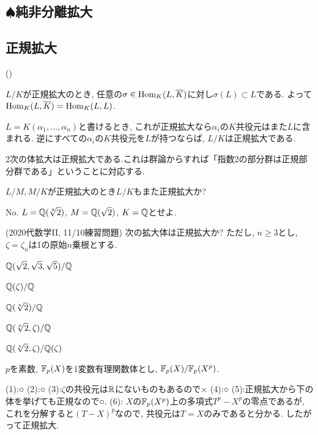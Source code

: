 \subsection{$\spadesuit$純非分離拡大}

\subsection{正規拡大}
\begin{prop} ()
\ben
\item $L/K$が正規拡大のとき, 任意の$\sigma\in\mathrm{Hom}_{K}(L,\overline{K})$に対し$\sigma(L)\subset L$である. よって$\mathrm{Hom}_{K}(L,\overline{K}) = \mathrm{Hom}_{K}(L,L)$.
\item $L=K(\alpha_1,\dots, \alpha_n)$と書けるとき, これが正規拡大なら$\alpha_i$の$K$共役元はまた$L$に含まれる. 逆にすべての$\alpha_i$の$K$共役元を$L$が持つならば, $L/K$は正規拡大である.
\een
\end{prop}

\begin{tips}
\ben
\item 2次の体拡大は正規拡大である.これは群論からすれば「指数2の部分群は正規部分群である」ということに対応する.
\een
\end{tips}

\begin{egprob}
$L/M,M/K$が正規拡大のとき$L/K$もまた正規拡大か?
\end{egprob}
\begin{egans}
No. $L=\mathbb{Q}(\sqrt[4]{2})$, $M=\mathbb{Q}(\sqrt{2})$, $K=\mathbb{Q}$とせよ.
\end{egans}

\begin{egprob} (2020代数学II, 11/10練習問題)
次の拡大体は正規拡大か? ただし, $n\geq 3$とし, $\zeta = \zeta_n$は1の原始$n$乗根とする.
\ben
\item $\mathbb{Q}(\sqrt{2},\sqrt{3},\sqrt{5})/\mathbb{Q}$
\item $\mathbb{Q}(\zeta)/\mathbb{Q}$
\item $\mathbb{Q}(\sqrt[n]{2})/\mathbb{Q}$
\item $\mathbb{Q}(\sqrt[n]{2},\zeta)/\mathbb{Q}$
\item $\mathbb{Q}(\sqrt[n]{2},\zeta)/\mathbb{Q}(\zeta)$
\item $p$を素数, $\mathbb{F}_{p}(X)$を1変数有理関数体とし, $\mathbb{F}_{p}(X)/\mathbb{F}_{p}(X^p)$.
\een
\end{egprob}
\begin{egans}
(1):○ (2):○ (3):$\zeta$の共役元は$\mathbb{R}$にないものもあるので× (4):○ (5):正規拡大から下の体を挙げても正規なので○. (6): $X$の$\mathbb{F}_{p}(X^p)$上の多項式$T^p - X^p$の零点であるが, これを分解すると$(T-X)^p$なので, 共役元は$T=X$のみであると分かる. したがって正規拡大.
\end{egans}



